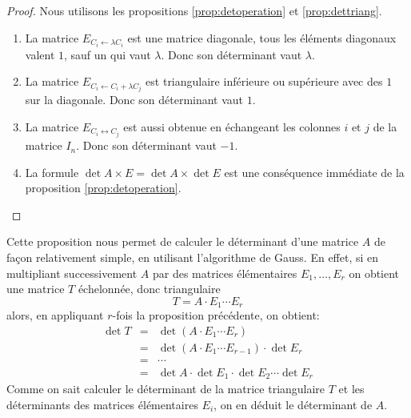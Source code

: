 \documentclass[class=report,crop=false]{standalone}
\begin{document}
\begin{proof}
Nous utilisons les propositions \ref{prop:detoperation} et \ref{prop:dettriang}.

\begin{enumerate}
  \item La matrice $E_{C_i \leftarrow \lambda C_i}$ est une matrice diagonale,
  tous les éléments diagonaux valent $1$, sauf un qui vaut $\lambda$. Donc son déterminant
  vaut $\lambda$.

  \item La matrice $E_{C_i \leftarrow C_i+\lambda C_j}$ est triangulaire inférieure
  ou supérieure avec des $1$ sur la diagonale. Donc son déterminant
  vaut $1$.

  \item La matrice $E_{C_i \leftrightarrow C_j}$ est aussi obtenue en échangeant
les colonnes $i$ et $j$ de la matrice $I_n$. Donc son déterminant
  vaut $-1$.

  \item La formule $\det A \times E = \det A \times \det E$ est une conséquence
  immédiate de la proposition \ref{prop:detoperation}.
\end{enumerate}
\end{proof}



Cette proposition nous permet de calculer le déterminant d'une matrice $A$ de façon
relativement simple, en utilisant l'algorithme de Gauss. En effet, si en multipliant successivement
$A$ par des matrices élémentaires $E_1,\ldots,E_r$ on obtient une matrice $T$
échelonnée, donc triangulaire
\[
T = A  \cdot E_1 \cdots E_r
\]
alors, en appliquant $r$-fois la proposition précédente, on obtient:
$$
\begin{array}{rcl}
\det T
  &=& \det (A \cdot E_1 \cdots E_r) \\
  &=& \det (A \cdot E_1 \cdots E_{r-1})\cdot \det E_r \\
  &=& \cdots \\
  &=& \det A \cdot \det E_1\cdot \det E_2 \cdots \det E_r
\end{array}
$$
Comme on sait calculer le déterminant de la matrice triangulaire $T$ et les déterminants des matrices élémentaires
$E_i$, on en déduit le déterminant de $A$.
\end{document}
